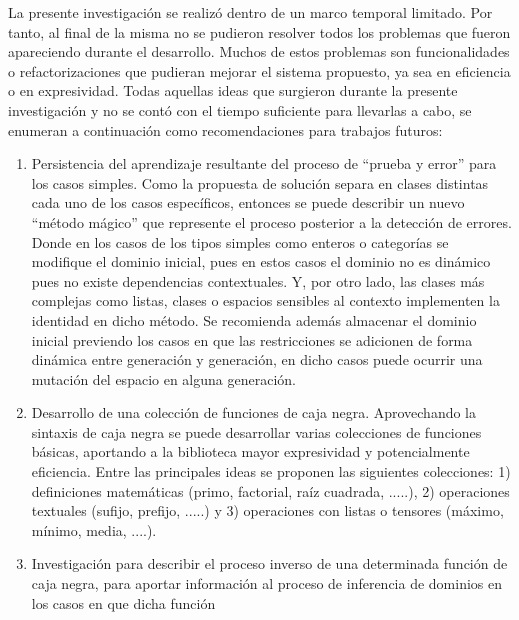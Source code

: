 \begin{recomendations}
      La presente investigación se realizó dentro de un marco temporal limitado. 
      Por tanto, al final de la misma no se pudieron resolver todos los problemas 
      que fueron apareciendo durante el desarrollo. Muchos de estos problemas son 
      funcionalidades o refactorizaciones que pudieran mejorar el sistema propuesto, 
      ya sea en eficiencia o en expresividad. Todas aquellas ideas que surgieron durante 
      la presente investigación y no se contó con el tiempo suficiente para llevarlas a 
      cabo, se enumeran a continuación como recomendaciones para trabajos futuros: 

    \begin{enumerate}
        \item   Persistencia del aprendizaje resultante del proceso de “prueba y error” para los casos
              simples. Como la propuesta de solución separa en clases distintas cada uno de los casos
              específicos, entonces se puede describir un nuevo “método mágico” que represente el proceso
              posterior a la detección de errores. Donde en los casos de los tipos simples como enteros o
              categorías se modifique el dominio inicial, pues en estos casos el dominio no es dinámico pues
              no existe dependencias contextuales. Y, por otro lado, las clases más complejas como listas,
              clases o espacios sensibles al contexto implementen la identidad en dicho método. Se
              recomienda además almacenar el dominio inicial previendo los casos en que las restricciones
              se adicionen de forma dinámica entre generación y generación, en dicho casos puede ocurrir
              una mutación del espacio en alguna generación.
        \item  Desarrollo de una colección de funciones de caja negra. Aprovechando la sintaxis de
              caja negra se puede desarrollar varias colecciones de funciones básicas, aportando a la biblioteca
              mayor expresividad y potencialmente eficiencia. Entre las principales ideas se proponen las
              siguientes colecciones: 1) definiciones matemáticas (primo, factorial, raíz cuadrada, .....),
              2) operaciones textuales (sufijo, prefijo, .....) y 3) operaciones con listas o tensores (máximo,
              mínimo, media, ....).
        \item  Investigación para describir el proceso inverso de una determinada función de caja negra,
              para aportar información al proceso de inferencia de dominios en los casos en que dicha función

\end{enumerate}
\end{recomendations}
